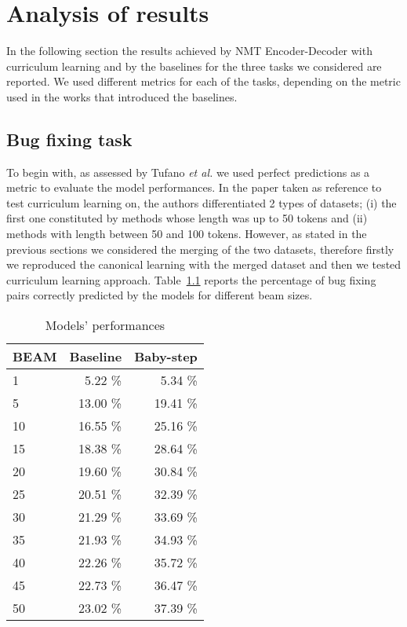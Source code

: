 \chapter{Analysis of results}
In the following section the results 
achieved by NMT Encoder-Decoder with curriculum learning and
by the baselines for the three tasks we considered are reported.
We used different metrics for each of the tasks, depending on the metric used in the works
that introduced the baselines.

\section{Bug fixing task}
To begin with, as assessed by Tufano \textit{et al.} \cite{Tufano2019} we used 
perfect predictions as a metric to evaluate the model performances. In the paper taken as reference
to test curriculum learning on, the authors differentiated 2 types of datasets; (i) the first one constituted by methods
whose length was up to 50 tokens and (ii) methods with length between 50 and 100 tokens. 
However, as stated in the previous sections
we considered the merging of the two datasets, 
therefore firstly we reproduced the canonical learning with the merged dataset and then we tested curriculum learning
approach.
Table~\ref{table:pp_bugfixing} reports the percentage %
of bug fixing pairs correctly predicted
by the models for different beam sizes.
\begin{table}[h!]
    \centering
    \begin{tabular}{l|r|r}
    BEAM & Baseline & Baby-step\\ [0.5ex]
    \hline 
    1 & 5.22 \% & 5.34 \%\\ 
    5 & 13.00 \% & 19.41 \%\\
    10 & 16.55 \% & 25.16 \%\\
    15 & 18.38 \% & 28.64 \%\\
    20 & 19.60 \% & 30.84 \%\\
    25 & 20.51 \% & 32.39 \%\\
    30 & 21.29 \% & 33.69 \%\\
    35 & 21.93 \% & 34.93 \%\\
    40 & 22.26 \% & 35.72 \%\\
    45 & 22.73 \% & 36.47 \%\\
    50 & 23.02 \% & 37.39 \%\\ [1ex]
    \end{tabular}
    \caption{Models' performances}
    \label{table:pp_bugfixing}
\end{table}
